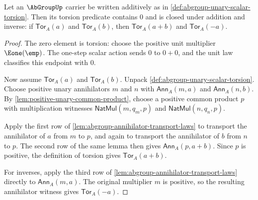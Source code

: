 \begin{theorem}
\label{thm:abgroup-torsion-subgroup-closure}
Let an $\AbGroupUp$ carrier be written additively as in \autoref{def:abgroup-unary-scalar-torsion}. Then its torsion predicate contains $0$ and is closed under addition and inverse: if $\mathsf{Tor}_A(a)$ and $\mathsf{Tor}_A(b)$, then $\mathsf{Tor}_A(a+b)$ and $\mathsf{Tor}_A(-a)$.
\end{theorem}
\begin{proof}
The zero element is torsion: choose the positive unit multiplier $\Eone(\emp)$. The one-step scalar action sends $0$ to $0+0$, and the unit law classifies this endpoint with $0$.

Now assume $\mathsf{Tor}_A(a)$ and $\mathsf{Tor}_A(b)$. Unpack \autoref{def:abgroup-unary-scalar-torsion}. Choose positive unary annihilators $m$ and $n$ with $\mathsf{Ann}_A(m,a)$ and $\mathsf{Ann}_A(n,b)$. By \autoref{lem:positive-unary-common-product}, choose a positive common product $p$ with multiplication witnesses $\mathsf{NatMul}(m,q_m,p)$ and $\mathsf{NatMul}(n,q_n,p)$.

Apply the first row of \autoref{lem:abgroup-annihilator-transport-laws} to transport the annihilator of $a$ from $m$ to $p$, and again to transport the annihilator of $b$ from $n$ to $p$. The second row of the same lemma then gives $\mathsf{Ann}_A(p,a+b)$. Since $p$ is positive, the definition of torsion gives $\mathsf{Tor}_A(a+b)$.

For inverses, apply the third row of \autoref{lem:abgroup-annihilator-transport-laws} directly to $\mathsf{Ann}_A(m,a)$. The original multiplier $m$ is positive, so the resulting annihilator witness gives $\mathsf{Tor}_A(-a)$.
\end{proof}

